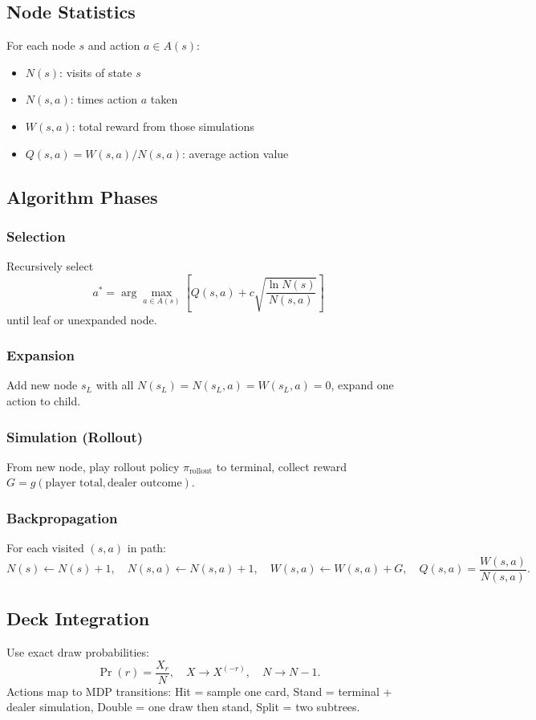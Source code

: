 \documentclass[12pt,a4paper]{cibb}
\begin{document}
\subsection*{Node Statistics}
For each node \(s\) and action \(a\in A(s)\):
\begin{itemize}[leftmargin=1.5cm]
  \item \(N(s)\): visits of state \(s\)
  \item \(N(s,a)\): times action \(a\) taken
  \item \(W(s,a)\): total reward from those simulations
  \item \(Q(s,a)=W(s,a)/N(s,a)\): average action value
\end{itemize}

\subsection*{Algorithm Phases}
\subsubsection*{Selection}
Recursively select
\[
 a^* = \arg\max_{a\in A(s)} \left[ Q(s,a) + c\sqrt{\frac{\ln N(s)}{N(s,a)}} \right]
\]
until leaf or unexpanded node.

\subsubsection*{Expansion}
Add new node \(s_L\) with all \(N(s_L)=N(s_L,a)=W(s_L,a)=0\), expand one action to child.

\subsubsection*{Simulation (Rollout)}
From new node, play rollout policy \(\pi_{\text{rollout}}\) to terminal, collect reward
\(G=g(\text{player total},\text{dealer outcome})\).

\subsubsection*{Backpropagation}
For each visited \((s,a)\) in path:
\[
 N(s)\leftarrow N(s)+1,\quad N(s,a)\leftarrow N(s,a)+1,\quad W(s,a)\leftarrow W(s,a)+G,\quad Q(s,a)=\frac{W(s,a)}{N(s,a)}.
\]

\subsection*{Deck Integration}
Use exact draw probabilities:
\[\Pr(r)=\frac{X_r}{N},\quad X\to X^{(-r)},\quad N\to N-1.\]
Actions map to MDP transitions: Hit = sample one card, Stand = terminal + dealer simulation, Double = one draw then stand, Split = two subtrees.
\end{document}
